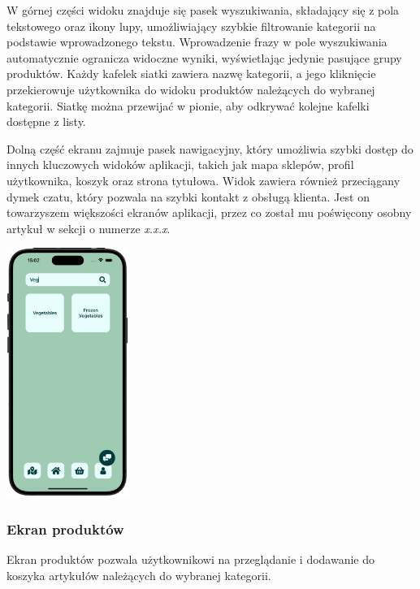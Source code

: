 W górnej części widoku znajduje się pasek wyszukiwania, składający się z pola tekstowego oraz ikony lupy, umożliwiający szybkie filtrowanie kategorii na podstawie wprowadzonego tekstu. Wprowadzenie frazy w pole wyszukiwania automatycznie ogranicza widoczne wyniki, wyświetlając jedynie pasujące grupy produktów. Każdy kafelek siatki zawiera nazwę kategorii, a jego kliknięcie przekierowuje użytkownika do widoku produktów należących do wybranej kategorii. Siatkę można przewijać w pionie, aby odkrywać kolejne kafelki dostępne z listy. 

Dolną część ekranu zajmuje pasek nawigacyjny, który umożliwia szybki dostęp do innych kluczowych widoków aplikacji, takich jak mapa sklepów, profil użytkownika, koszyk oraz strona tytułowa. Widok zawiera również przeciągany dymek czatu, który pozwala na szybki kontakt z obsługą klienta. Jest on towarzyszem większości ekranów aplikacji, przez co został mu poświęcony osobny artykuł w sekcji o numerze \textit{x.x.x}.

\begin{center} 
    \includegraphics[width=0.3\textwidth]{images/front/categories_filtered.png} 
\end{center}

\subsubsection{Ekran produktów}

Ekran produktów pozwala użytkownikowi na przeglądanie i dodawanie do koszyka artykułów należących do wybranej kategorii. 

